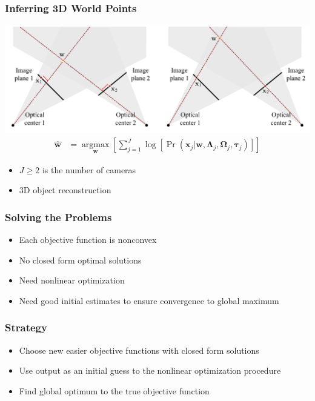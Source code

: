 \documentclass{beamer}
\begin{document}
\begin{frame}
  \frametitle{Inferring 3D World Points}
  \includegraphics[width=1.0\textwidth]{fig/recap3.png}
  \begin{align*}
    \mathbf{\hat{w}} &=
    \underset{\mathbf{w}}
    {\operatorname{argmax}} \left[
      \sum_{j=1}^J \log{\left[
    \Pr(\mathbf{x}_j|\mathbf{w},\boldsymbol{\Lambda}_j,\boldsymbol{\Omega}_j,
    \bm{\tau}_j)
      \right]}
  \right]
  \end{align*}
  \begin{itemize}
    \item<2-> $J \geq 2$ is the number of cameras
    \item<3-> 3D object reconstruction
  \end{itemize}
\end{frame}

\begin{frame}
  \frametitle{Solving the Problems}
  \begin{itemize}[<+->]
    \item Each objective function is nonconvex
    \item No closed form optimal solutions
    \item Need nonlinear optimization
    \item Need good initial estimates to ensure convergence to global maximum
  \end{itemize}
\end{frame}

\begin{frame}
  \frametitle{Strategy}
  \begin{itemize}[<+->]
    \item Choose new easier objective functions with closed form solutions
    \item Use output as an initial guess to the nonlinear optimization procedure
    \item Find global optimum to the true objective function
  \end{itemize}
\end{frame}
\end{document}
